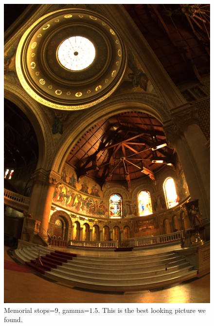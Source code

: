\documentclass[a4paper,12pt,oneside,final]{report}
\begin{document}
\begin{figure}[!h]
\centering
\includegraphics[scale=0.8]{pictures/stops_9_gamma_15.png}
\caption{Memorial stops=$9$, gamma=$1.5$. This is the best looking picture we found.}
\end{figure}
\end{document}
